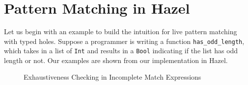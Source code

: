 \section{Pattern Matching in Hazel}\label{sec:examples}

Let us begin with an example to build the intuition for live pattern matching with typed holes. Suppose a programmer is writing a function \texttt{has\_odd\_length}, which takes in a list of \texttt{Int} and results in a \texttt{Bool} indicating if the list has odd length or not. Our examples are shown from our implementation in Hazel. 

\begin{figure}[h]
  \centering
\hfill
  \caption{Exhaustiveness Checking in Incomplete Match Expressions}
  \label{fig:exhaustiveness}
\end{figure}

